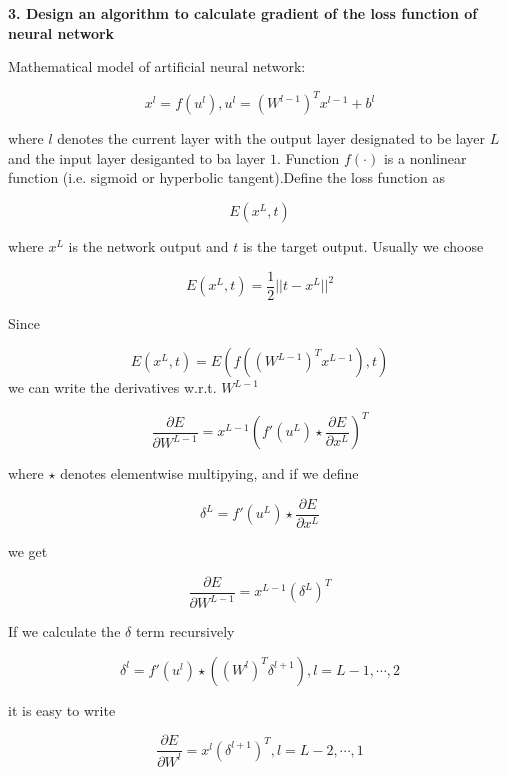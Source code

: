 \documentclass[UTF8]{ctexart}
\begin{document}
\textbf{3. Design an algorithm to calculate gradient of the loss function of neural network}\par
Mathematical model of artificial neural network:\par
\begin{equation*}
x^{l}=f(u^{l}), u^{l}=(W^{l-1})^{T}x^{l-1}+b^{l}
\end{equation*}\par
where $l$ denotes the current layer with the output layer designated to be layer $L$ and the input layer desiganted to ba layer $1$. Function $f(\cdot)$ is a nonlinear function (i.e. sigmoid or hyperbolic tangent).Define the loss function as\par
\begin{equation*}
E(x^{L},t)
\end{equation*}\par
where $x^{L}$ is the network output and $t$ is the target output. Usually we choose\par
\begin{equation*}
E(x^{L},t)=\frac{1}{2}||t-x^{L}||^{2}
\end{equation*}\par
Since\par
\begin{equation*}
E(x^{L},t)=E(f((W^{L-1})^{T}x^{L-1}),t)
\end{equation*}
we can write the derivatives w.r.t. $W^{L-1}$\par
\begin{equation*}
\frac{\partial E}{\partial W^{L-1}}=x^{L-1}(f'(u^{L})\star\frac{\partial E}{\partial x^{L}})^{T}
\end{equation*}\par
where $\star$ denotes elementwise multipying, and if we define\par
\begin{equation*}
\delta^{L}=f'(u^{L})\star\frac{\partial E}{\partial x^{L}}
\end{equation*}\par
we get\par
\begin{equation*}
\frac{\partial E}{\partial W^{L-1}}=x^{L-1}(\delta^{L})^{T}
\end{equation*}\par
If we calculate the $\delta$ term recursively\par
\begin{equation*}
\delta^{l}=f'(u^{l})\star((W^{l})^{T}\delta^{l+1}),l=L-1,\cdots,2
\end{equation*}\par
it is easy to write\par
\begin{equation*}
\frac{\partial E}{\partial W^{l}}=x^{l}(\delta^{l+1})^{T},l=L-2,\cdots,1
\end{equation*}
\end{document}
